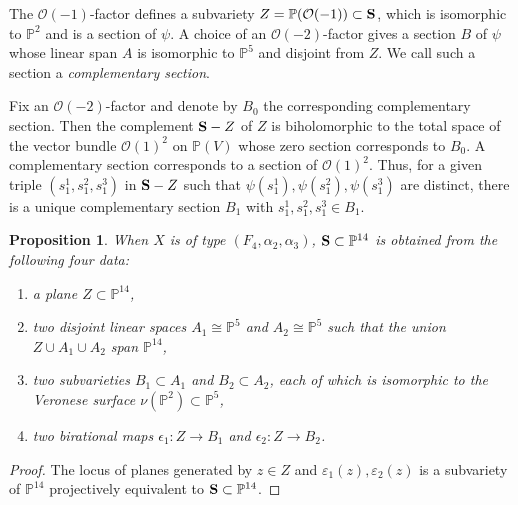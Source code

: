 \documentclass[12pt]{amsart}
\theoremstyle{plain}
\newtheorem{proposition}[theorem]{Proposition}
\theoremstyle{definition}
\begin{document}
The $\mathcal O(-1)$-factor defines a subvariety $Z=\mathbb P(\mathcal O(-1)) \subset {\bf S}$, which is isomorphic to $   \mathbb P^2$  %
 and is a section of $\psi$. A choice of an $\mathcal O(-2)$-factor gives a section $B$ of $\psi$ whose linear span $A$ is isomorphic to $\mathbb P^5$ and disjoint from $Z$. We call such a section a \emph{complementary section}. %

Fix an $\mathcal O(-2)$-factor and denote by $B_0$ the corresponding complementary section.
Then the complement ${\bf S} -Z$ of $Z$ is biholomorphic to the total space of the vector bundle $\mathcal O(1)^2$ on $\mathbb P(V)$ whose zero section corresponds to $B_0$. A complementary section corresponds to a section of $\mathcal O(1)^2$. Thus,  for a given   triple $(s_1^1, s_1^2, s_1^3)$ in ${\bf S} -Z$  such that $\psi(s_1^1), \psi(s_1^2), \psi(s_1^3)$ are distinct,  there is a unique complementary section  $B_1$   with  $s_1^1, s_1^2, s_1^3 \in B_1$.

\begin{proposition} \label{characterization of vmrt F}  When $X$ is of type $(F_4, \alpha_2, \alpha_3)$,
 ${\bf S} \subset \mathbb P^{14}$ is obtained from the following four data:
   \begin{enumerate}
\item[(i)] a plane $Z \subset \mathbb P^{14}$,
\item[(ii)] two disjoint linear spaces $A_1 \cong \mathbb P^5$ and $A_2 \cong \mathbb P^5$
such that the union $Z \cup A_1 \cup A_2$ span $\mathbb P^{14}$, %
\item[(iii)] two subvarieties $B_1 \subset A_1$ and $B_2 \subset A_2$, each of which is  isomorphic to the Veronese surface $\nu(\mathbb P^2) \subset \mathbb P^5$,
\item[(iv)] two birational maps $\epsilon_1 \colon Z \rightarrow B_1$ and $\epsilon_2 \colon Z \rightarrow B_2$.
   \end{enumerate}
\end{proposition}


\begin{proof}
The locus of planes generated by $z \in Z$ and $\varepsilon_1(z), \varepsilon_2(z)$ is a subvariety of $\mathbb P^{14}$ projectively equivalent to ${\bf S} \subset \mathbb P^{14}$.
\end{proof}
\end{document}
